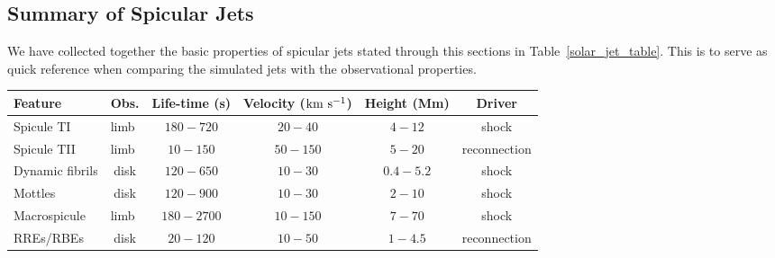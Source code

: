 \documentclass[12pt]{ociamthesis}
\begin{document}
\subsection{Summary of Spicular Jets}
\label{subsec:jet_table}
We have collected together the basic properties of spicular jets stated through this sections in Table~\ref{solar_jet_table}. This is to serve as quick reference when comparing the simulated jets with the observational properties.  
\begin{landscape}%
\begin{table*}
\caption{Values based on cited papers throughout Section~\ref{sec:spicule-jets}}
\label{solar_jet_table}
\begin{center}
\begin{tabular}{|l|l|l|l|l|p{1.7cm}|}
\hline
\textbf{Feature} & \multicolumn{1}{c|}{\textbf{Obs.}} & \multicolumn{1}{c|}{\textbf{Life-time (s)}} & \multicolumn{1}{c|}{\textbf{Velocity ($\rm{km \ s^{-1}}$)}} & \multicolumn{1}{c|}{\textbf{Height (Mm)}} & \multicolumn{1}{c|}{\textbf{Driver}} \\ \hline

Spicule TI  & limb &   \multicolumn{1}{c|}{$180-720$} & \multicolumn{1}{c|}{$20-40$} &  \multicolumn{1}{c|}{$4-12$}  & \multicolumn{1}{c|}{shock} \\ \hline

Spicule TII & limb & \multicolumn{1}{c|}{$ 10-150$} & \multicolumn{1}{c|}{$ 50-150$} & \multicolumn{1}{c|}{$5-20$}  & \multicolumn{1}{c|}{reconnection}  \\ \hline

Dynamic fibrils & \multicolumn{1}{c|}{disk} & \multicolumn{1}{c|}{$120-650$} & \multicolumn{1}{c|}{$10-30$} & \multicolumn{1}{c|}{$0.4-5.2$} & \multicolumn{1}{c|}{shock} \\ \hline

Mottles & \multicolumn{1}{c|}{disk} & \multicolumn{1}{c|}{$120-900$} & \multicolumn{1}{c|}{$10-30$} & \multicolumn{1}{c|}{$2-10$} & \multicolumn{1}{c|}{shock} \\ \hline

Macrospicule & limb  & \multicolumn{1}{c|}{$180-2700$} & \multicolumn{1}{c|}{$10-150$}  & \multicolumn{1}{c|}{$7-70$} & \multicolumn{1}{c|}{shock} \\ \hline

RREs/RBEs & \multicolumn{1}{c|}{disk}  & \multicolumn{1}{c|}{$20-120$} & \multicolumn{1}{c|}{$10-50$}  & \multicolumn{1}{c|}{$1-4.5$} & \multicolumn{1}{c|}{reconnection} \\ \hline
\end{tabular}
\end{center}
\end{table*}
\end{landscape}
\end{document}
